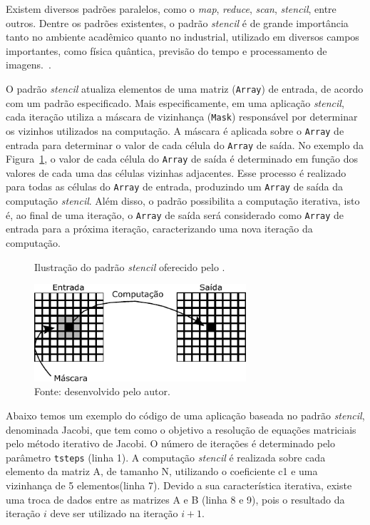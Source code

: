 Existem diversos padrões paralelos, como o \textit{map}, \textit{reduce},
\textit{scan}, \textit{stencil}, entre outros. Dentre os padrões existentes, o
padrão \textit{stencil} é de grande importância tanto no ambiente acadêmico quanto no
industrial, utilizado em diversos campos importantes, como física quântica,
previsão do tempo e processamento de imagens.~\cite{pereira15}.

O padrão \textit{stencil} atualiza elementos de uma matriz (\texttt{Array}) de entrada,
de acordo com um padrão especificado. Mais especificamente, em uma aplicação
\textit{stencil}, cada iteração utiliza a máscara de vizinhança (\texttt{Mask})
responsável por determinar os vizinhos utilizados na computação. A máscara é
aplicada sobre o \texttt{Array} de entrada para determinar o valor de cada
célula do \texttt{Array} de saída. No exemplo da Figura~\ref{fig:stencil}, o
valor de cada célula do \texttt{Array} de saída é determinado em função dos
valores de cada uma das células vizinhas adjacentes. Esse processo é realizado
para todas as células do \texttt{Array} de entrada, produzindo um \texttt{Array}
de saída da computação \textit{stencil}. Além disso, o padrão possibilita a computação
iterativa, isto é, ao final de uma iteração, o \texttt{Array} de saída será
considerado como \texttt{Array} de entrada para a próxima iteração,
caracterizando uma nova iteração da computação.

\begin{figure}[h]
	\centering
	\caption{Ilustração do padrão \textit{stencil} oferecido pelo \pskel.}
	\includegraphics[width=0.7\textwidth]{figs/stencilComp.pdf}
    \caption*{Fonte: desenvolvido pelo autor.}
	\label{fig:stencil}
\end{figure}

Abaixo temos um exemplo do código de uma aplicação baseada no padrão
\textit{stencil}, denominada Jacobi, que tem como o objetivo a
resolução de equações matriciais pelo método iterativo de Jacobi. O número de
iterações é determinado pelo parâmetro \texttt{tsteps} (linha 1). A computação
\textit{stencil} é realizada sobre cada elemento da matriz A, de tamanho N,
utilizando o coeficiente c1 e uma vizinhança de 5 elementos(linha 7). Devido a
sua característica iterativa, existe uma troca de dados entre as matrizes A e B
(linha 8 e 9), pois o resultado da iteração $i$ deve ser utilizado na iteração
$i+1$.

